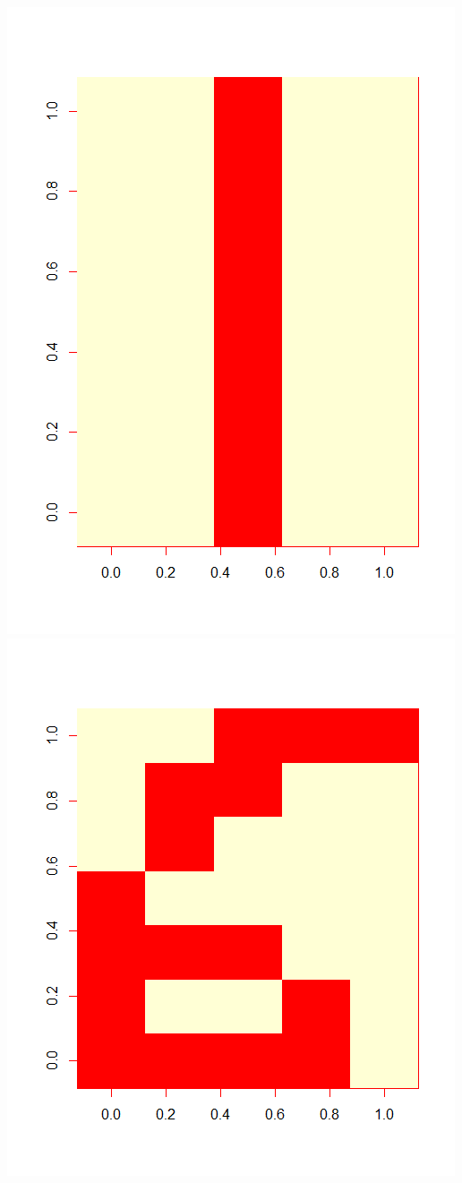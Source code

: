 \begin{minipage}{0.2\linewidth}
\includegraphics[width = \textwidth]{Figures/data1}
\includegraphics[width = \textwidth]{Figures/data6}
\end{minipage}
